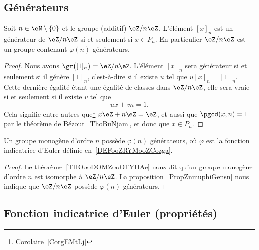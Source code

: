 \subsection{Générateurs}

\begin{proposition}     \label{PropZnmuphiGensn}
	Soit \( n\in\eN\setminus\{ 0 \}\) et le groupe (additif) \( \eZ/n\eZ\). L'élément \( [x]_n\) est un générateur de \( \eZ/n\eZ\) si et seulement si \( x\in P_n\). En particulier \( \eZ/n\eZ\) est un groupe contenant \( \varphi(n)\) générateurs.
\end{proposition}

\begin{proof}
	Nous avons \( \gr\big( [1]_n \big)=\eZ/n\eZ\). L'élément \( [x]_n\) sera générateur si et seulement si il génère \( [1]_n \), c'est-à-dire si il existe \( u\) tel que \( u[x]_n=[1]_n\). Cette dernière égalité étant une égalité de classes dans \( \eZ/n\eZ\), elle sera vraie si et seulement si il existe \( v\) tel que
	\begin{equation}
		ux+vn=1.
	\end{equation}
	Cela signifie entre autres que\footnote{Corolaire~\ref{CorgEMtLj}} \( x\eZ+n\eZ=\eZ\), et aussi que \( \pgcd(x,n)=1\) par le théorème de Bézout~\ref{ThoBuNjam}, et donc que \( x\in P_n\).
\end{proof}

\begin{corollary}\label{CORooMBLSooMHKmAq}
	Un groupe monogène d'ordre \( n\) possède \( \varphi(n)\) générateurs, où \( \varphi\) est la fonction indicatrice d'Euler définie en~\ref{DEFooZRYMooZCozga}.
\end{corollary}

\begin{proof}
	Le théorème~\ref{THOooDOMZooOEYHAe} nous dit qu'un groupe monogène d'ordre \( n\) est isomorphe à \( \eZ/n\eZ\). La proposition~\ref{PropZnmuphiGensn} nous indique que \( \eZ/n\eZ\) possède \( \varphi(n)\) générateurs.
\end{proof}

\subsection{Fonction indicatrice d'Euler (propriétés)}
\label{subSecKGDFooAbETjs}

